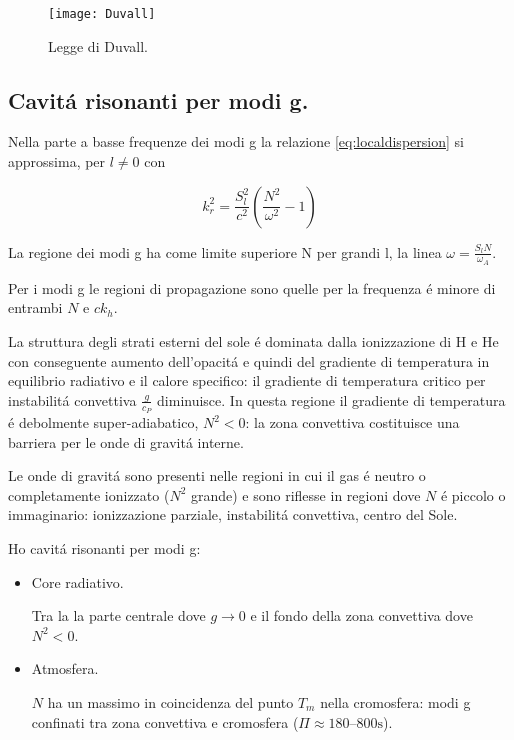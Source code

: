 \documentclass[../main.tex]{subfiles}
\begin{document}
\begin{figure}[!ht]
\centering
\texttt{[image: Duvall]}
\caption{Legge di Duvall.}
\end{figure}

\clearpage

\subsection{Cavit\'a risonanti per modi g.}

Nella parte a basse frequenze dei modi g la relazione \ref{eq:localdispersion} si approssima, per $l\neq0$ con

\begin{equation*}
k_r^2=\frac{S_l^2}{c^2}(\frac{N^2}{\omega^2}-1)
\end{equation*}

La regione dei modi g ha come limite superiore N per grandi l, la linea $\omega=\frac{S_lN}{\omega_A}$.

Per i modi g le regioni di propagazione sono quelle per la frequenza \'e minore di entrambi $N$ e $ck_h$.

La struttura degli strati esterni del sole \'e dominata dalla ionizzazione di H e He con conseguente aumento dell'opacit\'a e quindi del gradiente di temperatura in equilibrio radiativo e il calore specifico: il gradiente di temperatura critico per instabilit\'a convettiva $\frac{g}{c_P}$ diminuisce. In questa regione il gradiente di temperatura \'e debolmente super-adiabatico, $N^2<0$: la zona convettiva costituisce una barriera per le onde di gravit\'a interne.

Le onde di gravit\'a sono presenti nelle regioni in cui il gas \'e neutro o completamente ionizzato ($N^2$ grande) e sono riflesse in regioni dove $N$ \'e piccolo o immaginario: ionizzazione parziale, instabilit\'a convettiva, centro del Sole.

Ho cavit\'a risonanti per modi g:
\begin{itemize}
    \item Core radiativo.
    
    Tra la la parte centrale dove $g\to0$ e il fondo della zona convettiva dove $N^2<0$.
    \item Atmosfera.
    
    $N$ ha un massimo in coincidenza del punto $T_m$ nella cromosfera: modi g confinati tra zona convettiva e cromosfera ($\Pi\approx\numrange{180}{800}\si{\second}$).
\end{itemize}
\end{document}
